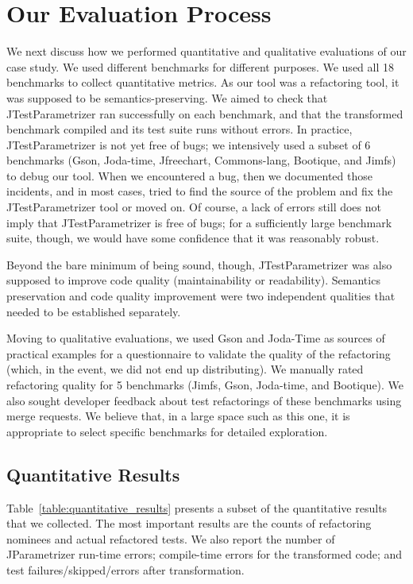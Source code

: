 \section{Our Evaluation Process}
\label{sec:our-evaluation-process}

We next discuss how we performed quantitative and qualitative
evaluations of our case study. We used different benchmarks for
different purposes. We used all 18 benchmarks to collect quantitative
metrics. As our tool was a refactoring tool, it was supposed to be
semantics-preserving. We aimed to check that JTestParametrizer ran
successfully on each benchmark, and that the transformed benchmark
compiled and its test suite runs without errors.  In practice,
JTestParametrizer is not yet free of bugs; we intensively used a
subset of 6 benchmarks (Gson, Joda-time, Jfreechart, Commons-lang,
Bootique, and Jimfs) to debug our tool.  When we encountered a bug,
then we documented those incidents, and in most cases, tried to find
the source of the problem and fix the JTestParametrizer tool or moved
on. Of course, a lack of errors still does not imply that
JTestParametrizer is free of bugs; for a sufficiently large benchmark suite,
though, we would have some confidence that it was reasonably robust.

Beyond the bare minimum of being sound, though, JTestParametrizer was
also supposed to improve code quality (maintainability or
readability). Semantics preservation and code quality improvement were
two independent qualities that needed to be established separately.

Moving to qualitative evaluations, we used Gson and Joda-Time as
sources of practical examples for a questionnaire to validate the
quality of the refactoring (which, in the event, we did not end up
distributing).  We manually rated refactoring quality for 5 benchmarks
(Jimfs, Gson, Joda-time, and Bootique). We also sought developer
feedback about test refactorings of these benchmarks using merge
requests.  We believe that, in a large space such as this one, it is
appropriate to select specific benchmarks for detailed exploration.

\subsection{Quantitative Results}
Table~\ref{table:quantitative_results} presents a subset of the
quantitative results that we collected. The most important results are
the counts of refactoring nominees and actual refactored tests. We
also report the number of JParametrizer run-time errors; compile-time
errors for the transformed code; and test failures/skipped/errors
after transformation.

